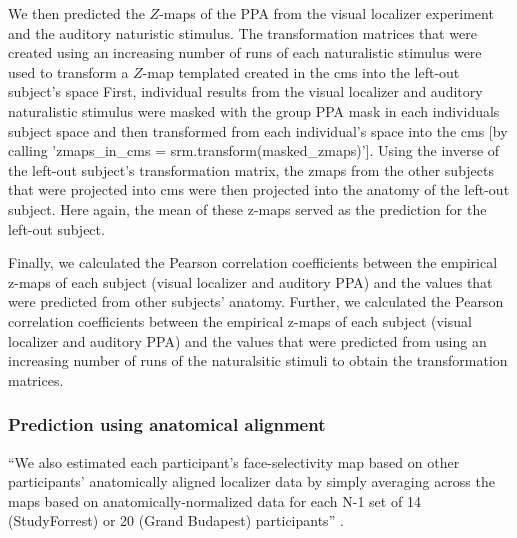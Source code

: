 We then predicted the $Z$-maps of the PPA from the visual localizer experiment
and the auditory naturistic stimulus.
%
The transformation matrices that were created using an increasing number of runs
of each naturalistic stimulus were used to transform a $Z$-map templated created
in the \ac{cms} into the left-out subject's space
%
First, individual results from the visual localizer and auditory naturalistic
stimulus were masked with the group PPA mask in each individuals subject space
and then transformed from each individual's space into the \ac{cms} [by calling
'zmaps\_in\_cms = srm.transform(masked\_zmaps)'].
Using the inverse of the left-out subject's transformation matrix, the zmaps
from the other subjects that were projected into \ac{cms} were then projected
into the anatomy of the left-out subject.
%
Here again, the mean of these z-maps served as the prediction for the left-out
subject.


Finally, we calculated the Pearson correlation coefficients between the
empirical z-maps of each subject (visual localizer and auditory PPA) and the
values that were predicted from other subjects' anatomy.
%
Further, we calculated the Pearson correlation coefficients between the
empirical z-maps of each subject (visual localizer and auditory PPA) and the
values that were predicted from using an increasing number of runs of the
naturalsitic stimuli to obtain the transformation matrices.


\subsubsection{Prediction using anatomical alignment}
%
``We also estimated each participant's face-selectivity map based on other
participants' anatomically aligned localizer data by simply averaging across the
maps based on anatomically-normalized data for each N-1 set of 14 (StudyForrest)
or 20 (Grand Budapest) participants'' \citep{jiahui2020predicting}.


